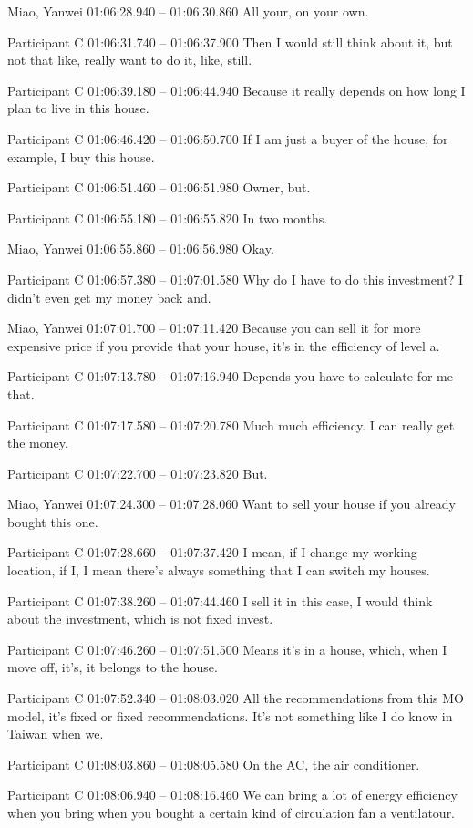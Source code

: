 {Miao, Yanwei 01:06:28.940 -- 01:06:30.860
All your, on your own.

Participant C 01:06:31.740 -- 01:06:37.900
Then I would still think about it, but not that like, really want to do it, like, still.

Participant C 01:06:39.180 -- 01:06:44.940
Because it really depends on how long I plan to live in this house.

Participant C 01:06:46.420 -- 01:06:50.700
If I am just a buyer of the house, for example, I buy this house.

Participant C 01:06:51.460 -- 01:06:51.980
Owner, but.

Participant C 01:06:55.180 -- 01:06:55.820
In two months.

Miao, Yanwei 01:06:55.860 -- 01:06:56.980
Okay.

Participant C 01:06:57.380 -- 01:07:01.580
Why do I have to do this investment? I didn't even get my money back and.

Miao, Yanwei 01:07:01.700 -- 01:07:11.420
Because you can sell it for more expensive price if you provide that your house, it's in the efficiency of level a.

Participant C 01:07:13.780 -- 01:07:16.940
Depends you have to calculate for me that.

Participant C 01:07:17.580 -- 01:07:20.780
Much much efficiency. I can really get the money.

Participant C 01:07:22.700 -- 01:07:23.820
But.

Miao, Yanwei 01:07:24.300 -- 01:07:28.060
Want to sell your house if you already bought this one.

Participant C 01:07:28.660 -- 01:07:37.420
I mean, if I change my working location, if I, I mean there's always something that I can switch my houses.

Participant C 01:07:38.260 -- 01:07:44.460
I sell it in this case, I would think about the investment, which is not fixed invest.

Participant C 01:07:46.260 -- 01:07:51.500
Means it's in a house, which, when I move off, it's, it belongs to the house.

Participant C 01:07:52.340 -- 01:08:03.020
All the recommendations from this MO model, it's fixed or fixed recommendations. It's not something like I do know in Taiwan when we.

Participant C 01:08:03.860 -- 01:08:05.580
On the AC, the air conditioner.

Participant C 01:08:06.940 -- 01:08:16.460
We can bring a lot of energy efficiency when you bring when you bought a certain kind of circulation fan a ventilatour.

}
